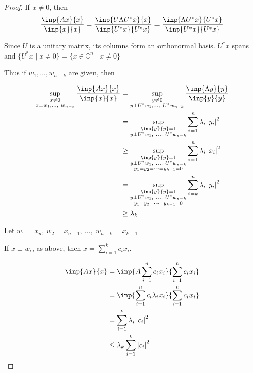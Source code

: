 \documentclass[twofold]{article}
\newcommand*\adj[1]{#1^*}
\newcommand*\abs[1]{\left \vert #1 \right\vert}
\theoremstyle{plain}
\theoremstyle{definition}
\theoremstyle{remark}
\begin{document}
\begin{proof} 

 If \(x \neq 0\), then \[\frac{\inp{Ax}{x}}{\inp{x}{x}} = \frac{\inp{U \Lambda \adj{U} x}{x}}{\inp{\adj{U} x}{ \adj{U} x}} =  \frac{\inp{\Lambda \adj{U} x}{ \adj{U} x}}{\inp{\adj{U}x}{\adj{U}x}}\]

Since \(U\) is a unitary matrix, its columns form an orthonormal basis.  \(\adj{U}x\) spans and \( \{ \adj{U} x \mid x \neq 0\}  = \{x \in \mathbb{C}^n \mid x \ne 0 \}\) 



Thus if \(w_1, \ldots , w_{n-k}\) are given, then 

\begin{equation*} \begin{split}
\sup_{\substack{x \neq 0 \\ x \perp w_1, \ldots, \ w_{n-k}}} \frac{\inp{Ax}{x}}{\inp{x}{x}} & = \sup_{\substack{y \neq 0 \\ y \perp \adj{U} w_1, \ldots ,\ \adj{U} w_{n-k}}} \frac{\inp{\Lambda y}{y}}{\inp{y}{y}} \\
&  = \sup_{\substack{\inp{y}{y} = 1 \\ y \perp \adj{U} w_1, \ \ldots , \ \adj{U}w_{n-k}}} \sum_{i = 1}^n \lambda_i \abs{y_i}^2 \\
&  \ge \sup_{\substack{\inp{y}{y} = 1 \\ y \perp \adj{U} w_1, \ \ldots , \ \adj{U} w_{n-k} \\ y_1 = y_2 = \cdots = y_{k-1} = 0 }} \sum_{i = 1}^n \lambda_i \abs{x_i}^2 \\
&  = \sup_{\substack{\inp{y}{y} = 1 \\ y \perp \adj{U} w_1, \ \ldots , \ \adj{U} w_{n-k} \\ y_1 = y_2 = \cdots = y_{k-1} = 0 }} \sum_{i = k}^n \lambda_i \abs{y_i}^2 \\
&  \ge \lambda_k 
\end{split} \end{equation*}


Let \(w_1 = x_n , \ w_2 = x_{n-1}, \ \ldots , \ w_{n-k} = x_{k + 1}\)

If \(x\perp w_i\), as above, then \(x = \sum_{i = 1} ^k c_i x_i\). 

\begin{equation*} \begin{split}
\inp{Ax}{x} & = \inp{A \sum_{i = 1} ^ n c_i x_i}{ \sum_{i = 1} ^n c_i x_i} \\
&  = \inp{\sum_{i = 1} ^n c_i \lambda_i x_i}{\sum_{i = 1} ^n c_i x_i}\\
& = \sum_{i = 1} ^ k \lambda_i \abs{c_i}^2 \\
&  \le \lambda_k \sum_{i = 1} ^{k} \abs{c_i}^2
\end{split} \end{equation*}
\end{proof}
\end{document}

